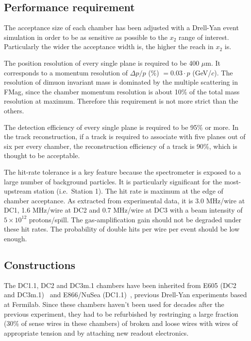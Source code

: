 \subsection{Performance requirement}

The acceptance size of each chamber has been adjusted with
a Drell-Yan event simulation
in order to be as sensitive as possible to the $x_2$ range of interest.
Particularly the wider the acceptance width is,
the higher the reach in $x_2$ is.

The position resolution of every single plane is required to be 400 $\mu$m.
It corresponds to a momentum resolution of
$\Delta p / p$ (\%) $= 0.03 \cdot p$ (GeV/$c$).
The resolution of dimuon invariant mass is dominated by
the multiple scattering in FMag, 
since the chamber momentum resolution is about 10\% of the total mass resolution at maximum.
Therefore this requirement is not more strict than the others.

The detection efficiency of every single plane is required to be 95\% or more.
In the track reconstruction, 
if a track is required to associate with five planes out of six per every chamber,
the reconstruction efficiency of a track is 90\%,
which is thought to be acceptable.

The hit-rate tolerance is a key feature because
the spectrometer is exposed to a large number of background particles.
It is particularly significant for the most-upstream station (i.e.~Station 1).
The hit rate is maximum at the edge of chamber acceptance.
As extracted from experimental data,
it is 3.0 MHz/wire at DC1, 1.6 MHz/wire at DC2 and 0.7 MHz/wire at DC3
with a beam intensity of $5\times10^{12}$ protons/spill.
The gas-amplification gain should not be degraded under these hit rates.
The probability of double hits per wire per event should be low enough.


\subsection{Constructions}

The DC1.1, DC2 and DC3m.1 chambers have been inherited from
E605 (DC2 and DC3m.1)~\cite{PhysRevD.43.2815} and E866/NuSea (DC1.1)~\cite{PhysRevLett.80.3715, Towell:2001nh}, previous Drell-Yan experiments based at Fermilab.
Since these chambers haven't been used for decades after the previous experiment, 
they had to be refurbished
by restringing a large fraction (30\% of sense wires in these chambers)
of broken and loose wires with wires of appropriate tension
and by attaching new readout electronics.

